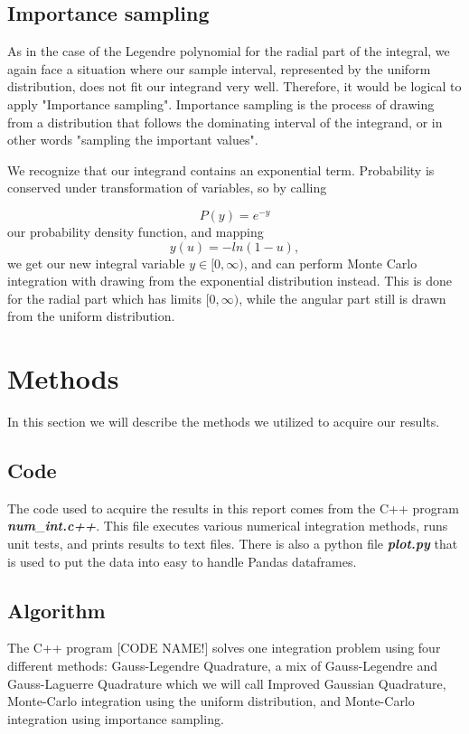 \documentclass{emulateapj}
\begin{document}
\subsection{Importance sampling}
As in the case of the Legendre polynomial for the radial part of the integral, we again face a situation where our sample interval, represented by the uniform distribution, does not fit our integrand very well. Therefore, it would be logical to apply "Importance sampling". Importance sampling is the process of drawing from a distribution that follows the dominating interval of the integrand, or in other words "sampling the important values".

We recognize that our integrand contains an exponential term. Probability is conserved under transformation of variables, so by calling

\begin{equation}
    P(y) = e^{-y}
\end{equation}
our probability density function, and mapping
\begin{equation}
    y(u) = -ln\left(1-u\right),
\end{equation}
we get our new integral variable $y\in [0,\infty)$, and can perform Monte Carlo integration with drawing from the exponential distribution instead. This is done for the radial part which has limits $[0,\infty)$, while the angular part still is drawn from the uniform distribution.

\section{Methods}
\label{sec:methods}
In this section we will describe the methods we utilized to acquire our results.
\subsection{Code}
The code used to acquire the results in this report comes from the C++ program \textbf{\textit{num}}\_\textbf{\textit{int.c++}}. This file executes various numerical integration methods, runs unit tests, and prints results to text files. There is also a python file \textbf{\textit{plot.py}} that is used to put the data into easy to handle Pandas dataframes.

\subsection{Algorithm}
The C++ program [CODE NAME!] solves one integration problem using four different methods: Gauss-Legendre Quadrature, a mix of Gauss-Legendre and Gauss-Laguerre Quadrature which we will call Improved Gaussian Quadrature, Monte-Carlo integration using the uniform distribution, and Monte-Carlo integration using importance sampling.
\end{document}
